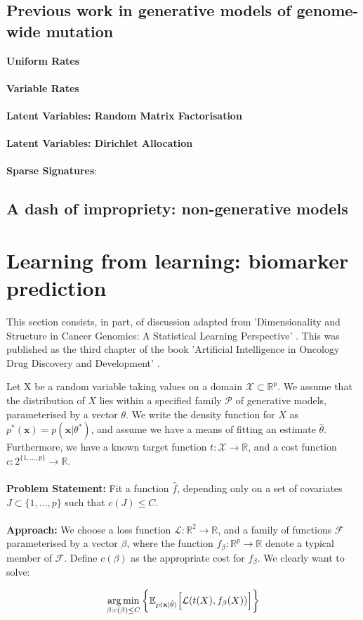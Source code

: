 \documentclass[../thesis.tex]{subfiles}
\begin{document}
\subsection{Previous work in generative models of genome-wide mutation}
\textbf{Uniform Rates} \\
\citep{budczies_optimizing_2019}  \\
\textbf{Variable Rates} \\
\citep{yao_ectmb_2020} \\
\textbf{Latent Variables: Random Matrix Factorisation} \\
\citep{fantini_mutsignatures_2020} \\
\textbf{Latent Variables: Dirichlet Allocation} \\
\citep{matsutani_discovering_2019} \\
\textbf{Sparse Signatures}: \\
\citep{lal_novo_2021}

\subsection{A dash of impropriety: non-generative models}

\section{Learning from learning: biomarker prediction}
This section consists, in part, of discussion adapted from 'Dimensionality and Structure in Cancer Genomics: A Statistical Learning Perspective' \citep{bradley_dimensionality_2020}. This was published as the third chapter of the book 'Artificial Intelligence in Oncology Drug Discovery and Development' \citep{cassidy_artificial_2020}.

Let X be a random variable taking values on a domain $\mathcal{X} \subset \mathbb{R}^p$. We assume that the distribution of $X$ lies within a specified family $\mathcal{P}$ of generative models, parameterised by a vector $\theta$. We write the density function for $X$ as $p^*(\mathbf{x}) = p(\mathbf{x} | \theta^*)$, and assume we have a means of fitting an estimate $\hat{\theta}$. Furthermore, we have a known target function $t: \mathcal{X} \rightarrow \mathbb{R}$, and a cost function $c: 2^{\{1, \dots, p\}} \rightarrow \mathbb{R}$.  \\
~\\
\textbf{Problem Statement:} Fit a function $\hat{f}$, depending only on a set of covariates $J \subset \{1, \ldots, p\}$ such that $c(J) \leq C$. \\
~\\
\textbf{Approach:} We choose a loss function $\mathcal{L}: \mathbb{R}^2 \rightarrow \mathbb{R}$, and a family of functions $\mathcal{F}$ parameterised by a vector $\beta$, where the function $f_\beta: \mathbb{R}^p \rightarrow \mathbb{R}$ denote a typical member of $\mathcal{F}$. Define $c(\beta)$ as the appropriate cost for $f_{\beta}$. We clearly want to solve:

\[\operatorname*{arg\,min}_{\beta: c(\beta) \leq C} \bigg\{ \mathbb{E}_{p(\mathbf{x}|\hat{\theta})} \Big[\mathcal{L}(t(X), f_{\beta}(X)) \Big] \bigg\} \]






\dobib %
\end{document}
